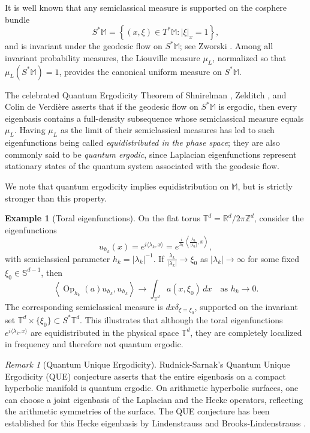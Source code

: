 \documentclass[12pt,reqno]{amsart}
\DeclareMathOperator{\Op}{Op}
\newcommand{\M}{\mathbb{M}}
\newcommand{\R}{\mathbb{R}}
\newcommand{\Sb}{\mathbb{S}}
\newcommand{\T}{\mathbb{T}}
\newcommand{\Z}{\mathbb{Z}}
\theoremstyle{plain}
\theoremstyle{definition}
\newtheorem*{ex}{Example}
\theoremstyle{remark}
\newtheorem*{rmk}{Remark}
\numberwithin{equation}{section}
\begin{document}
It is well known that any semiclassical measure is supported on the cosphere bundle
$$S^*\M=\left\{(x,\xi)\in T^*\M:|\xi|_x=1\right\},$$
and is invariant under the geodesic flow on $S^*\M$; see Zworski \cite[Section~5.2]{Zw}. Among all invariant probability measures, the Liouville measure $\mu_L$, normalized so that $\mu_L(S^*\M)=1$, provides the canonical uniform measure on $S^*\M$.

The celebrated Quantum Ergodicity Theorem of Shnirelman \cite{Shn}, Zelditch \cite{Ze1}, and Colin de Verdi\`ere \cite{CdV} asserts that if the geodesic flow on $S^*\M$ is ergodic, then every eigenbasis contains a full-density subsequence whose semiclassical measure equals $\mu_L$. Having $\mu_L$ as the limit of their semiclassical measures has led to such eigenfunctions being called \textit{equidistributed in the phase space}; they are also commonly said to be \textit{quantum ergodic}, since Laplacian eigenfunctions represent stationary states of the quantum system associated with the geodesic flow.

We note that quantum ergodicity implies equidistribution on $\M$, but is strictly stronger than this property.
\begin{ex}[Toral eigenfunctions]
On the flat torus $\T^d=\R^d/2\pi\Z^d$, consider the eigenfunctions
$$u_{h_k}(x)=e^{i\langle\lambda_k,x\rangle}=e^{\frac{i}{h_k}\left\langle\frac{\lambda_k}{\left|\lambda_k\right|},x\right\rangle},$$
with semiclassical parameter $h_k=|\lambda_k|^{-1}$. If $\frac{\lambda_k}{|\lambda_k|}\to\xi_0$ as $|\lambda_k|\to\infty$ for some fixed $\xi_0\in\Sb^{d-1}$, then 
$$\left\langle\Op_{h_k}(a)u_{h_k},u_{h_k}\right\rangle\to\int_{\T^d}a\left(x,\xi_0\right)\,dx\quad\text{as }h_k\to0.$$
The corresponding semiclassical measure is $dx\delta_{\xi=\xi_0}$, supported on the invariant set $\T^d\times\{\xi_0\}\subset S^*\T^d$. This illustrates that although the toral eigenfunctions $e^{i\langle\lambda_k,x\rangle}$ are equidistributed in the physical space $\T^d$, they are completely localized in frequency and therefore not quantum ergodic.
\end{ex}

\begin{rmk}[Quantum Unique Ergodicity]
Rudnick-Sarnak’s Quantum Unique Ergodicity (QUE) conjecture \cite{RS} asserts that the entire eigenbasis on a compact hyperbolic manifold is quantum ergodic. On arithmetic hyperbolic surfaces, one can choose a joint eigenbasis of the Laplacian and the Hecke operators, reflecting the arithmetic symmetries of the surface. The QUE conjecture has been established for this Hecke eigenbasis by Lindenstrauss \cite{L} and Brooks-Lindenstrauss \cite{BrLi}. 
\end{rmk}
\end{document}
